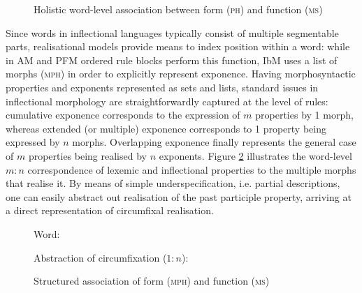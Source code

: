 \documentclass[output=paper]{langsci/langscibook}
\begin{document}
\begin{figure}
  \caption{Holistic word-level association between form (\textsc{ph}) and
    function (\textsc{ms})}
  \label{fig:Word}
\end{figure}

Since words in inflectional languages typically consist of multiple
segment\-able parts, realisational models provide means to index
position within a word: while in AM and PFM ordered rule blocks
perform this function, IbM uses a list of morphs (\textsc{mph}) in order
to explicitly represent exponence. Having morphosyntactic
properties and exponents represented as sets and lists, standard issues in
inflectional morphology are straightforwardly captured at the level of rules: cumulative
exponence corresponds to the expression of $m$ properties by 1 morph,
whereas extended (or multiple) exponence corresponds to 1 property
being expressed by $n$ morphs. Overlapping exponence finally
represents the general case of $m$ properties being realised by $n$
exponents. Figure \ref{fig:WordMph} illustrates the word-level $m:n$
correspondence of lexemic and inflectional properties to the multiple
morphs that realise it. By means of simple underspecification,
i.e. partial descriptions, one can easily abstract out realisation of
the past participle property, arriving at a direct representation of circumfixal
realisation.

\begin{figure}
    \begin{minipage}[t]{.55\textwidth}\centering\footnotesize
      Word:\medskip\\
      \end{minipage}\begin{minipage}[t]{.45\textwidth}\centering\footnotesize
      Abstraction of circumfixation ($1:n$):\medskip\\
      \end{minipage}
  \caption{Structured association of form (\textsc{mph}) and function (\textsc{ms}) }
  \label{fig:WordMph}
\end{figure}
\end{document}
